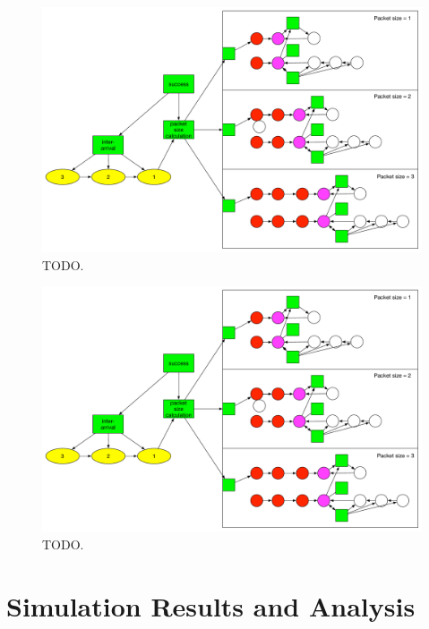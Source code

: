 \documentclass{llncs}
\begin{document}
\begin{figure}
\begin{center}
\includegraphics[scale=0.35]{../../sketches/compressible_dcf_all.pdf}
\caption{TODO.}
\label{fig:compressible_dcf_all}
\end{center}
\end{figure}

\begin{figure}
\begin{center}
\includegraphics[scale=0.35]{../../sketches/compressible_dcf_all.pdf}
\caption{TODO.}
\label{fig:compressible_dcf_all}
\end{center}
\end{figure}

\section{Simulation Results and Analysis}






\end{document}
